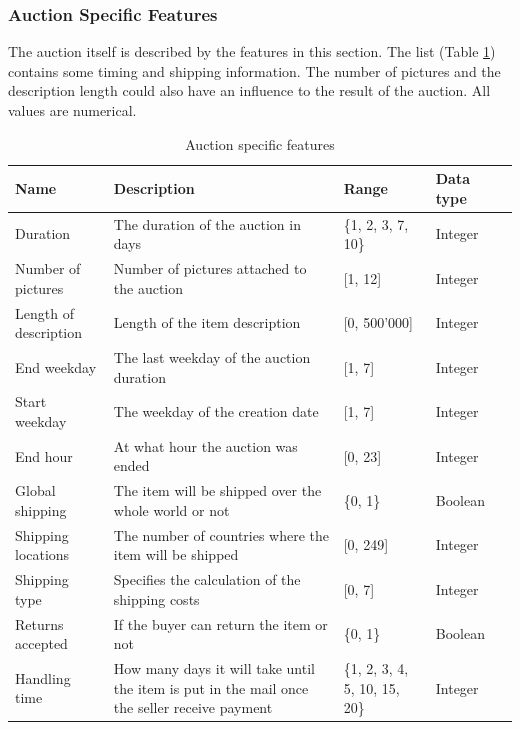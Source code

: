 \subsubsection{Auction Specific Features}
The auction itself is described by the features in this section. The list (Table \ref{tab:auction_features}) contains some timing and shipping information. The number of pictures and the description length could also have an influence to the result of the auction. All values are numerical.
\begin{table}[h!]
	\begin{center}
	\begin{tabular}{| p{2.6cm} | p{2.6cm} | p{2.6cm} | p{2.6cm} | p{2.6cm} |}
		\hline
		\textbf{Name} & \textbf{Description} &  \textbf{Range} & \textbf{Data type} \\
		\hline
		Duration & The duration of the auction in days & \{1, 2, 3, 7, 10\} & Integer \\
		\hline
		Number of pictures & Number of pictures attached to the auction & [1, 12] & Integer \\
		\hline
		Length of description & Length of the item description & [0, 500'000] & Integer \\
		\hline
		End weekday & The last weekday of the auction duration & [1, 7] & Integer \\
		\hline
		Start weekday & The weekday of the creation date & [1, 7] & Integer \\
		\hline
		End hour & At what hour the auction was ended & [0, 23] & Integer \\
		\hline
		Global shipping & The item will be shipped over the whole world or not & \{0, 1\} & Boolean \\
		\hline
		Shipping locations & The number of countries where the item will be shipped & [0, 249] & Integer \\
		\hline
		Shipping type & Specifies the calculation of the shipping costs & [0, 7] & Integer \\
		\hline
		Returns accepted & If the buyer can return the item or not & \{0, 1\} & Boolean \\
		\hline
		Handling time & How many days it will take until the item is put in the mail once the seller receive payment & \{1, 2, 3, 4, 5, 10, 15, 20\} & Integer \\
		\hline
	\end{tabular}
	\end{center}
	\caption{Auction specific features}
	\label{tab:auction_features}
\end{table}
